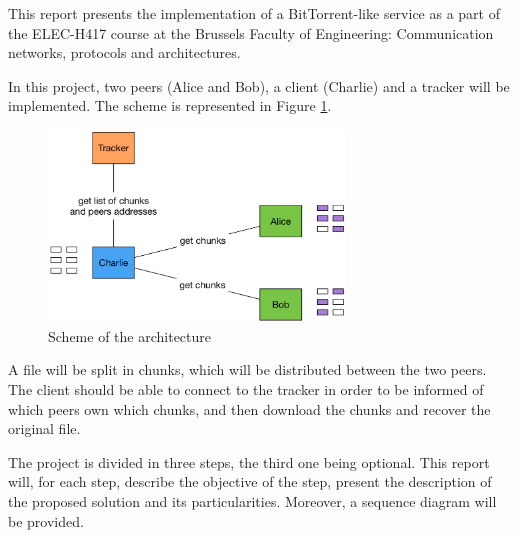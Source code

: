 This report presents the implementation of a BitTorrent-like service as a part of the ELEC-H417 course at the Brussels Faculty of Engineering: Communication networks, protocols and architectures.

In this project, two peers (Alice and Bob), a client (Charlie) and a tracker will be implemented. The scheme is represented in Figure \ref{fig:scheme}. 

\begin{figure}[h]
    \centering
    \includegraphics[width = 0.7\textwidth]{img/scheme.png}
    \caption{Scheme of the architecture}
    \label{fig:scheme}
\end{figure}

A file will be split in chunks, which will be distributed between the two peers. The client should be able to connect to the tracker in order to be informed of which peers own which chunks, and then download the chunks and recover the original file.

The project is divided in three steps, the third one being optional. This report will, for each step, describe the objective of the step, present the description of the proposed solution and its particularities. Moreover, a sequence diagram will be provided.
